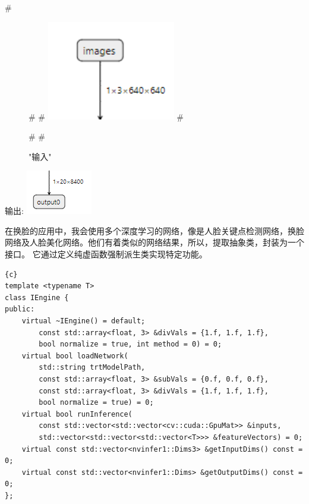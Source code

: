 #\begin{figure}[htbp]
#    \centering
#	\includegraphics[width=0.5\textwidth]{figures/inputs.png}
#	\caption{"输入"}
#    \label{fig:input}
#\end{figure}
输出:
\includegraphics{figures/output.png}

在换脸的应用中，我会使用多个深度学习的网络，像是人脸关键点检测网络，换脸网络及人脸美化网络。他们有着类似的网络结果，所以，提取抽象类，封装为一个接口。
它通过定义纯虚函数强制派生类实现特定功能。

\begin{lstlisting}{c}
template <typename T>
class IEngine {
public:
    virtual ~IEngine() = default;
        const std::array<float, 3> &divVals = {1.f, 1.f, 1.f}, 
        bool normalize = true, int method = 0) = 0;
    virtual bool loadNetwork(
        std::string trtModelPath, 
        const std::array<float, 3> &subVals = {0.f, 0.f, 0.f},
        const std::array<float, 3> &divVals = {1.f, 1.f, 1.f}, 
        bool normalize = true) = 0;
    virtual bool runInference(
        const std::vector<std::vector<cv::cuda::GpuMat>> &inputs, 
        std::vector<std::vector<std::vector<T>>> &featureVectors) = 0;
    virtual const std::vector<nvinfer1::Dims3> &getInputDims() const = 0;
    virtual const std::vector<nvinfer1::Dims> &getOutputDims() const = 0;
};
\end{lstlisting}

